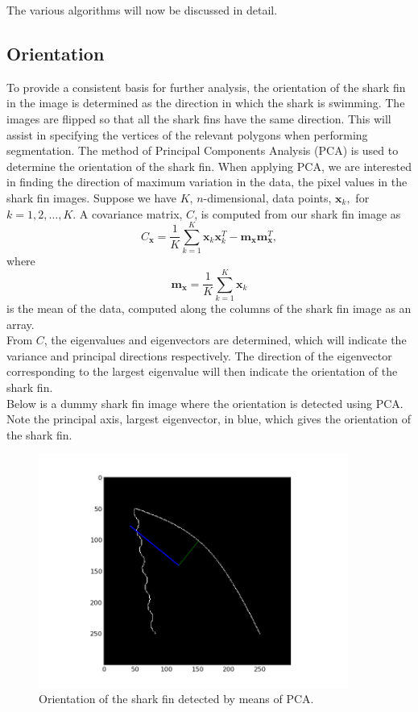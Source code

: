 \documentclass[a4paper,10pt]{article}
\begin{document}
The various algorithms will now be discussed in detail.  

\subsection{Orientation}
\label{orient}
To provide a consistent basis for further analysis, the
orientation of the shark fin in the image is determined as the direction in
which the shark is
swimming.  The images are flipped so that
all the shark fins have the same direction.  This will assist in specifying the vertices of the relevant polygons when performing
segmentation.
The method of Principal Components Analysis (PCA) is used to determine the orientation of the shark fin.  When applying
PCA, we are interested in finding the direction of maximum variation in the
data, the pixel values in the shark fin images.  Suppose we have $K$, $n$-dimensional, data points, $\mathbf{x}_k,$ for
$k=1,2, \ldots ,K$.  A covariance matrix, $C$, is computed from our shark fin image as 
\[
 C_{\mathbf{x}} = \frac{1}{K} \sum_{k=1}^{K} \mathbf{x}_{k}\mathbf{x}_{k}^{T} -
\mathbf{m}_{\mathbf{x}}\mathbf{m}_{\mathbf{x}}^{T} 
,\]
where
\[
 \mathbf{m}_{\mathbf{x}} = \frac{1}{K} \sum_{k=1}^{K}\mathbf{x}_{k}
\]
is the mean of the data, computed along the columns of the shark fin image as an array. \\


From $C$, the eigenvalues and eigenvectors are determined, which will indicate the
variance and principal directions respectively.
The direction of the eigenvector corresponding to the largest eigenvalue will
then indicate the orientation of the shark fin. \\

Below is a dummy shark fin image where the orientation is detected using PCA.
Note the principal axis, largest eigenvector, in blue, which gives the
orientation of the shark fin.
\begin{figure}[H]
 \centering
 \includegraphics[width=4in]{orientation.jpg}
 \caption{Orientation of the shark fin detected by means of PCA.}
 \label{orientation}
\end{figure}
\end{document}
